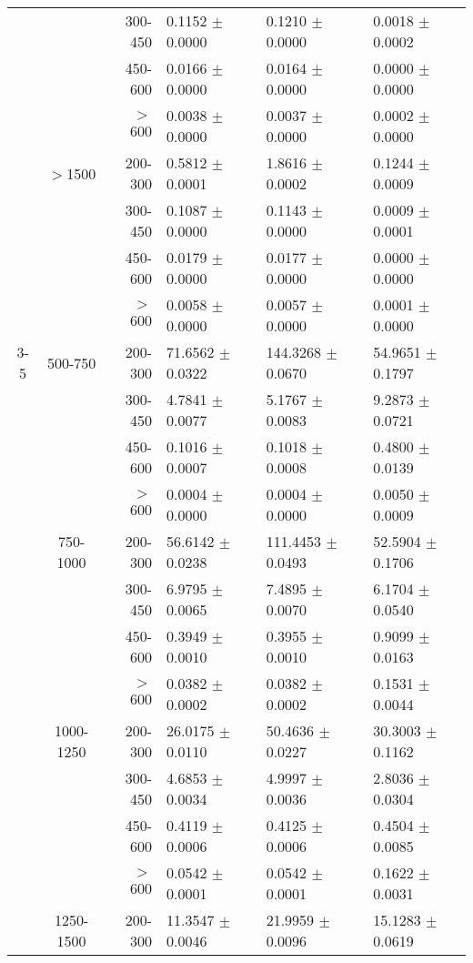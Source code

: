 \documentclass[11pt]{amsart}
\begin{document}
\begin{table}[htdp]
\begin{center}
\begin{tabular}{|c|c|r|l|l|l|}
  	&				& 300-450 & 	0.1152 $\pm$ 0.0000  & 	0.1210 $\pm$ 0.0000  & 	0.0018 $\pm$ 0.0002 \\
  	&				& 450-600 & 	0.0166 $\pm$ 0.0000  & 	0.0164 $\pm$ 0.0000  & 	0.0000 $\pm$ 0.0000 \\
  	&				& $>$600 & 	0.0038 $\pm$ 0.0000  & 	0.0037 $\pm$ 0.0000  & 	0.0002 $\pm$ 0.0000 \\
  	& $>$1500	& 200-300 & 	0.5812 $\pm$ 0.0001  & 	1.8616 $\pm$ 0.0002  & 	0.1244 $\pm$ 0.0009 \\
  	&				& 300-450 & 	0.1087 $\pm$ 0.0000  & 	0.1143 $\pm$ 0.0000  & 	0.0009 $\pm$ 0.0001 \\
  	&				& 450-600 & 	0.0179 $\pm$ 0.0000  & 	0.0177 $\pm$ 0.0000  & 	0.0000 $\pm$ 0.0000 \\
  	&				& $>$600 & 	0.0058 $\pm$ 0.0000  & 	0.0057 $\pm$ 0.0000  & 	0.0001 $\pm$ 0.0000 \\
\hline
3-5&	500-750	& 200-300 & 	71.6562 $\pm$ 0.0322  & 	144.3268 $\pm$ 0.0670  & 	54.9651 $\pm$ 0.1797 \\
  	&				& 300-450 & 	4.7841 $\pm$ 0.0077  & 	5.1767 $\pm$ 0.0083  & 	9.2873 $\pm$ 0.0721 \\
  	&				& 450-600 & 	0.1016 $\pm$ 0.0007  & 	0.1018 $\pm$ 0.0008  & 	0.4800 $\pm$ 0.0139 \\
  	&				& $>$600 & 	0.0004 $\pm$ 0.0000  & 	0.0004 $\pm$ 0.0000  & 	0.0050 $\pm$ 0.0009 \\
  	& 750-1000	& 200-300 & 	56.6142 $\pm$ 0.0238  & 	111.4453 $\pm$ 0.0493  & 	52.5904 $\pm$ 0.1706 \\
  	&				& 300-450 & 	6.9795 $\pm$ 0.0065  & 	7.4895 $\pm$ 0.0070  & 	6.1704 $\pm$ 0.0540 \\
  	&				& 450-600 & 	0.3949 $\pm$ 0.0010  & 	0.3955 $\pm$ 0.0010  & 	0.9099 $\pm$ 0.0163 \\
  	&				& $>$600 & 	0.0382 $\pm$ 0.0002  & 	0.0382 $\pm$ 0.0002  & 	0.1531 $\pm$ 0.0044 \\
  	& 1000-1250 & 200-300 & 	26.0175 $\pm$ 0.0110  & 	50.4636 $\pm$ 0.0227  & 	30.3003 $\pm$ 0.1162 \\
  	&				& 300-450 & 	4.6853 $\pm$ 0.0034  & 	4.9997 $\pm$ 0.0036  & 	2.8036 $\pm$ 0.0304 \\
  	&				& 450-600 & 	0.4119 $\pm$ 0.0006  & 	0.4125 $\pm$ 0.0006  & 	0.4504 $\pm$ 0.0085 \\
  	&				& $>$600 & 	0.0542 $\pm$ 0.0001  & 	0.0542 $\pm$ 0.0001  & 	0.1622 $\pm$ 0.0031 \\
  	& 1250-1500 & 200-300 & 	11.3547 $\pm$ 0.0046  & 	21.9959 $\pm$ 0.0096  & 	15.1283 $\pm$ 0.0619 \\

\end{tabular}
\end{center}
\end{table}
\end{document}
